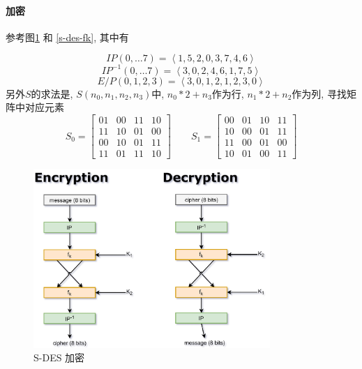 \documentclass{ctexart}
\begin{document}
\paragraph{加密}
    参考图\ref{s-des-enc} 和 \ref{s-des-fk}, 其中有\par
    \[IP(0,\ldots 7) = \left\langle 1, 5, 2, 0, 3, 7, 4, 6 \right\rangle\]
    \[IP^{-1}(0,\ldots7) = \left\langle 3, 0, 2, 4, 6, 1, 7, 5\right\rangle\]
    \[E/P(0, 1, 2, 3) = \left\langle 3, 0, 1, 2, 1, 2, 3, 0 \right\rangle\]
    另外$S$的求法是, $S(n_0, n_1, n_2, n_3)$中, $n_0*2 + n_3$作为行, $n_1*2+n_2$作为列, 寻找矩阵中对应元素\[
        S_0 = \begin{bmatrix}
            01 & 00 & 11 & 10\\
            11 & 10 & 01 & 00\\
            00 & 10 & 01 & 11\\
            11 & 01 & 11 & 10\end{bmatrix}\qquad
        S_1 = \begin{bmatrix}
            00 & 01 & 10 & 11\\
            10 & 00 & 01 & 11\\
            11 & 00 & 01 & 00\\
            10 & 01 & 00 & 11\end{bmatrix}
    \]
    \begin{figure}[ht!]
        \centering
        \includegraphics[height=0.5\textheight,width=0.8\textwidth,keepaspectratio]{s-des-enc.jpg}
        \caption{S-DES 加密}
        \label{s-des-enc}
    \end{figure}
\end{document}
